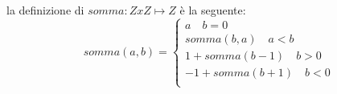 \documentclass[a4paper]{report}
\begin{document}
la definizione di $somma:Z x Z \mapsto Z$ è la seguente:
\begin{equation*}
    somma(a,b) = \begin{cases} a \quad b = 0 \\
                               somma(b,a) \quad a < b \\
                               1 + somma(b-1) \quad b > 0\\
                               -1 + somma(b+1) \quad b < 0 \\
                  \end{cases}
\end{equation*}
\end{document}
